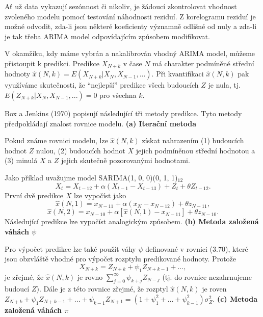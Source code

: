 Ať už data vykazují sezónnost či nikoliv, je žádoucí zkontrolovat vhodnost zvoleného modelu pomocí testování náhodnosti reziduí. Z korelogramu reziduí je možné odvodit, zda-li jsou některé koeficienty významně odlišné od nuly a zda-li je tak třeba ARIMA model odpovídajícím způsobem modifikovat.

V okamžiku, kdy máme vybrán a nakalibrován vhodný ARIMA model, můžeme přistoupit k predikci. Predikce $X_{N + k}$ v čase $N$ má charakter podmíněné střední hodnoty $\hat{x}(N, k) = E(X_{N + k}| X_N, X_{N - 1}, ...)$. Při kvantifikaci $\hat{x}(N, k)$ pak využíváme skutečnosti, že ``nejlepší'' predikce všech budoucích $Z$ je nula, tj. $E(Z_{N + k}|X_N, X_{N - 1}, ...) = 0$ pro všechna $k$.

Box a Jenkins (1970) popisují následující tři metody predikce. Tyto metody předpokládají znalost rovnice modelu.
\bigbreak
\noindent
\textbf{(a) Iterační metoda}

Pokud známe rovnici modelu, lze $\hat{x}(N,k)$ získat nahrazením (1) budoucích hodnot $Z$ nulou, (2) budoucích hodnot $X$ jejich podmíněnou střední hodnotou a (3) minulá $X$ a $Z$ jejich skutečně pozorovanými hodnotami.

Jako příklad uvažujme model SARIMA(1, 0, 0)(0, 1, 1)$_{12}$
\begin{equation}
X_t = X_{t - 12} + \alpha(X_{t - 1} - X_{t - 13}) + Z_t + \theta Z_{t - 12}.
\end{equation}
První dvě predikce $X$ lze vypočíst jako
\begin{equation}
\hat{x}(N, 1 ) = x_{N - 11} + \alpha (x_N - x_{N - 12}) + \theta z_{N - 11},
\end{equation}
\begin{equation}
\hat{x}(N, 2) = x_{N - 10} + \alpha[\hat{x}(N, 1) - x_{N - 11}] + \theta z_{N - 10}.
\end{equation}
Následující predikce lze vypočíst analogickým způsobem.
\bigbreak
\noindent
\textbf{(b) Metoda založená váhách $\psi$}

Pro výpočet predikce lze také použít váhy $\psi$ definované v rovnici (3.70), které jsou obzvláště vhodné pro výpočet rozptylu predikované hodnoty. Protože
\begin{equation}
X_{N + k} = Z_{N + k} + \psi_1 Z_{N + k - 1} + ...,
\end{equation}
je zřejmé, že $\hat{x}(N, k)$ je rovno $\sum_{j = 0}^{\infty} \psi_{k + j} Z_{N - j}$ (tj. do rovnice nezahrnujeme budoucí $Z$). Dále je z této rovnice zřejmé, že rozptyl $\hat{x}(N, k)$ je roven $Z_{N + k} + \psi_1 Z_{N + k - 1} + ... + \psi_{k - 1} Z_{N + 1} = (1 + \psi_1^2 + ... + \psi_{k - 1}^2) \sigma_Z^2$.
\bigbreak
\noindent
\textbf{(c) Metoda založená váhách $\pi$}

